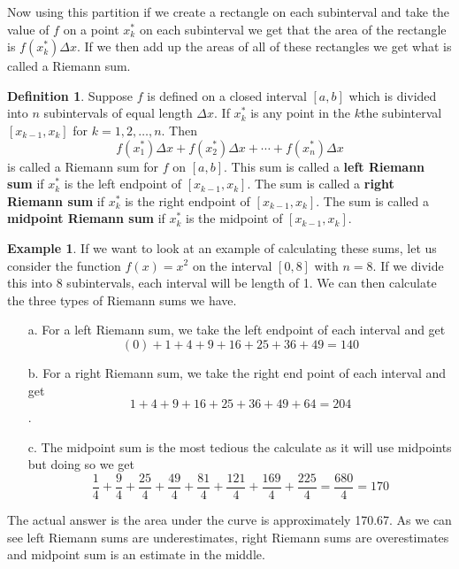 \documentclass[12pt,reqno]{article}
\theoremstyle{definition}
\newtheorem*{Definition}{Definition}
\newtheorem*{Example}{Example}
\begin{document}
Now using this partition if we create a rectangle on each subinterval and take the value of $f$ on a point $x_{k}^{*} $ on each subinterval we get that the area of the rectangle is $f(x_{k}^{*}) \Delta x$. If we then add up the areas of all of these rectangles we get what is called a Riemann sum. 

\begin{Definition}
	Suppose $f$ is defined on a closed interval $[a, b]$ which is divided into $n$ subintervals of equal length $\Delta x$. If $x_{k}^{*}$ is any point in the $k$the subinterval $[x_{k -1}, x_k]$ for $k = 1, 2, \ldots, n$. Then $$f(x_{1}^{*}) \Delta x + f(x_{2}^{*}) \Delta x + \cdots + f(x_{n}^{*})\Delta x$$ is called a Riemann sum for $f$ on $[a, b]$. This sum is called a \textbf{left Riemann sum} if $x_{k}^*$ is the left endpoint of $[x_{k - 1}, x_k]$. The sum is called a \textbf{right Riemann sum} if $x_{k}^*$ is the right endpoint of $[x_{k - 1}, x_k]$. The sum is called a \textbf{midpoint Riemann sum} if $x_{k}^*$ is the midpoint of $[x_{k - 1}, x_k]$. 
\end{Definition}

\begin{Example}
	If we want to look at an example of calculating these sums, let us consider the function $f(x) = x^2$ on the interval $[0, 8]$ with $n = 8$. If we divide this into $8$ subintervals, each interval will be length of 1. We can then calculate the three types of Riemann sums we have. 
	\begin{enumerate}
		\item[a.] For a left Riemann sum, we take the left endpoint of each interval and get $$(0) + 1 + 4 + 9 + 16 + 25 + 36 + 49 = 140$$ 
		\item[b.] For a right Riemann sum, we take the right end point of each interval and get $$ 1 + 4 + 9 + 16 + 25 + 36 + 49 + 64 = 204$$. 
		\item[c.] The midpoint sum is the most tedious the calculate as it will use midpoints but doing so we get $$\frac{1}{4} + \frac{9}{4} + \frac{25}{4} + \frac{49}{4} + \frac{81}{4} + \frac{121}{4} + \frac{169}{4} + \frac{225}{4} = \frac{680}{4} = 170$$
	\end{enumerate}

	The actual answer is the area under the curve is approximately 170.67. As we can see left Riemann sums are underestimates, right Riemann sums are overestimates and midpoint sum is an estimate in the middle. 
\end{Example}
\end{document}

